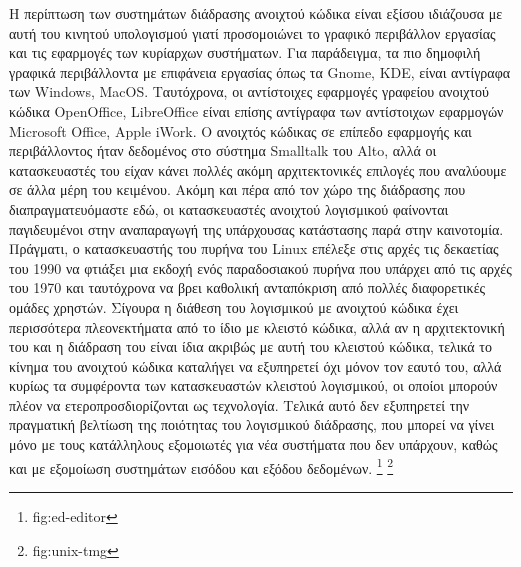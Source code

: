\documentclass[
]{article}
\begin{document}
Η περίπτωση των συστημάτων διάδρασης ανοιχτού κώδικα είναι εξίσου
ιδιάζουσα με αυτή του κινητού υπολογισμού γιατί προσομοιώνει το γραφικό
περιβάλλον εργασίας και τις εφαρμογές των κυρίαρχων συστήματων. Για
παράδειγμα, τα πιο δημοφιλή γραφικά περιβάλλοντα με επιφάνεια εργασίας
όπως τα Gnome, KDE, είναι αντίγραφα των Windows, MacOS. Ταυτόχρονα, οι
αντίστοιχες εφαρμογές γραφείου ανοιχτού κώδικα OpenOffice, LibreOffice
είναι επίσης αντίγραφα των αντίστοιχων εφαρμογών Microsoft Office, Apple
iWork. Ο ανοιχτός κώδικας σε επίπεδο εφαρμογής και περιβάλλοντος ήταν
δεδομένος στο σύστημα Smalltalk του Alto, αλλά οι κατασκευαστές του
είχαν κάνει πολλές ακόμη αρχιτεκτονικές επιλογές που αναλύουμε σε άλλα
μέρη του κειμένου. Ακόμη και πέρα από τον χώρο της διάδρασης που
διαπραγματευόμαστε εδώ, οι κατασκευαστές ανοιχτού λογισμικού φαίνονται
παγιδευμένοι στην αναπαραγωγή της υπάρχουσας κατάστασης παρά στην
καινοτομία. Πράγματι, ο κατασκευαστής του πυρήνα του Linux επέλεξε στις
αρχές τις δεκαετίας του 1990 να φτιάξει μια εκδοχή ενός παραδοσιακού
πυρήνα που υπάρχει από τις αρχές του 1970 και ταυτόχρονα να βρει
καθολική ανταπόκριση από πολλές διαφορετικές ομάδες χρηστών. Σίγουρα η
διάθεση του λογισμικού με ανοιχτού κώδικα έχει περισσότερα πλεονεκτήματα
από το ίδιο με κλειστό κώδικα, αλλά αν η αρχιτεκτονική του και η
διάδραση του είναι ίδια ακριβώς με αυτή του κλειστού κώδικα, τελικά το
κίνημα του ανοιχτού κώδικα καταλήγει να εξυπηρετεί όχι μόνον τον εαυτό
του, αλλά κυρίως τα συμφέροντα των κατασκευαστών κλειστού λογισμικού, οι
οποίοι μπορούν πλέον να ετεροπροσδιορίζονται ως τεχνολογία. Τελικά αυτό
δεν εξυπηρετεί την πραγματική βελτίωση της ποιότητας του λογισμικού
διάδρασης, που μπορεί να γίνει μόνο με τους κατάλληλους εξομοιωτές για
νέα συστήματα που δεν υπάρχουν, καθώς και με εξομοίωση συστημάτων
εισόδου και εξόδου δεδομένων. \footnote{fig:ed-editor} \footnote{fig:unix-tmg}
\end{document}
